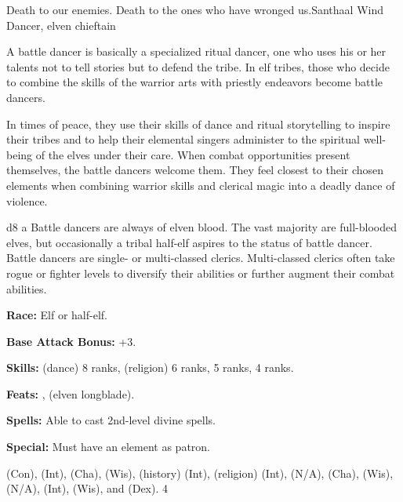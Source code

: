 {Death to our enemies. Death to the ones who have wronged us.}{Santhaal Wind Dancer, elven chieftain}
{A battle dancer is basically a specialized ritual dancer, one who uses his or her talents not to tell stories but to defend the tribe. In elf tribes, those who decide to combine the skills of the warrior arts with priestly endeavors become battle dancers.

In times of peace, they use their skills of dance and ritual storytelling to inspire their tribes and to help their elemental singers administer to the spiritual well-being of the elves under their care. When combat opportunities present themselves, the battle dancers welcome them. They feel closest to their chosen elements when combining warrior skills and clerical magic into a deadly dance of violence.}
{d8}
{a}
{Battle dancers are always of elven blood. The vast majority are full-blooded elves, but occasionally a tribal half-elf aspires to the status of battle dancer. Battle dancers are single- or multi-classed clerics. Multi-classed clerics often take rogue or fighter levels to diversify their abilities or further augment their combat abilities.}
{
\textbf{Race:} Elf or half-elf.

\textbf{Base Attack Bonus:} +3.

\textbf{Skills:}  (dance) 8 ranks,  (religion) 6 ranks,  5 ranks,  4 ranks.

\textbf{Feats:} ,  (elven longblade).

\textbf{Spells:} Able to cast 2nd-level divine spells.

\textbf{Special:} Must have an element as patron.
}
{ (Con),  (Int),  (Cha),  (Wis),  (history) (Int),  (religion) (Int),  (N/A),  (Cha),  (Wis),  (N/A),  (Int),  (Wis), and  (Dex).}
{4}
{}{}
